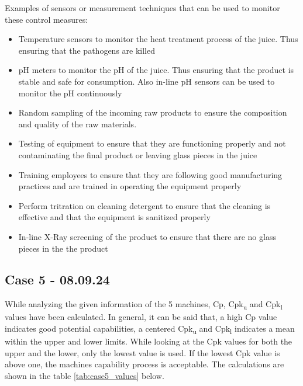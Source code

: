 \vspace{1\baselineskip}

Examples of sensors or measurement techniques that can be used to monitor these control measures:
\begin{itemize}
    \item Temperature sensors to monitor the heat treatment process of the juice. Thus ensuring that the pathogens are killed
    \item pH meters to monitor the pH of the juice. Thus ensuring that the product is stable and safe for consumption. Also in-line pH sensors can be used to monitor the pH continuously
    \item Random sampling of the incoming raw products to ensure the composition and quality of the raw materials. 
    \item Testing of equipment to ensure that they are functioning properly and not contaminating the final product or leaving glass pieces in the juice
    \item Training employees to ensure that they are following good manufacturing practices and are trained in operating the equipment properly
    \item Perform tritration on cleaning detergent to ensure that the cleaning is effective and that the equipment is sanitized properly
    \item In-line X-Ray screening of the product to ensure that there are no glass pieces in the the product
\end{itemize}




\newpage
\subsection{Case 5 - 08.09.24}
While analyzing the given information of the 5 machines, Cp, Cpk\textsubscript{u} and Cpk\textsubscript{l} values have been calculated. In general, it can be said that, a high Cp value indicates good potential capabilities, a centered Cpk\textsubscript{u} and Cpk\textsubscript{l} indicates a mean within the upper and lower limits. While looking at the Cpk values for both the upper and the lower, only the lowest value is used. If the lowest Cpk value is above one, the machines capability process is acceptable. The calculations are shown in the table \ref*{tab:case5_values} below.

